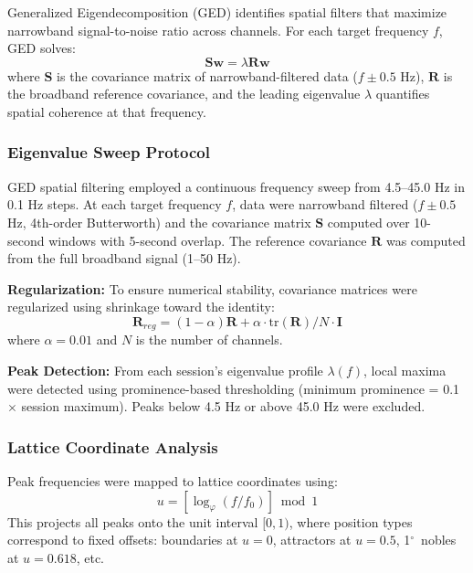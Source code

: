 \documentclass[11pt,a4paper]{article}
\newcommand{\degree}{$^\circ$}  %
\newcommand{\phisym}{\varphi}
\begin{document}
Generalized Eigendecomposition (GED) \parencite{cohen2017ged} identifies spatial filters that maximize narrowband signal-to-noise ratio across channels. For each target frequency $f$, GED solves:
\begin{equation}
\mathbf{S} \mathbf{w} = \lambda \mathbf{R} \mathbf{w}
\end{equation}
where $\mathbf{S}$ is the covariance matrix of narrowband-filtered data ($f \pm 0.5$ Hz), $\mathbf{R}$ is the broadband reference covariance, and the leading eigenvalue $\lambda$ quantifies spatial coherence at that frequency.

\subsubsection{Eigenvalue Sweep Protocol}

GED spatial filtering employed a continuous frequency sweep from 4.5--45.0 Hz in 0.1 Hz steps. At each target frequency $f$, data were narrowband filtered ($f \pm 0.5$ Hz, 4th-order Butterworth) and the covariance matrix $\mathbf{S}$ computed over 10-second windows with 5-second overlap. The reference covariance $\mathbf{R}$ was computed from the full broadband signal (1--50 Hz).

\textbf{Regularization:} To ensure numerical stability, covariance matrices were regularized using shrinkage toward the identity:
\begin{equation}
\mathbf{R}_{reg} = (1-\alpha)\mathbf{R} + \alpha \cdot \text{tr}(\mathbf{R})/N \cdot \mathbf{I}
\end{equation}
where $\alpha = 0.01$ and $N$ is the number of channels.

\textbf{Peak Detection:} From each session's eigenvalue profile $\lambda(f)$, local maxima were detected using prominence-based thresholding (minimum prominence = 0.1 $\times$ session maximum). Peaks below 4.5 Hz or above 45.0 Hz were excluded.

\subsubsection{Lattice Coordinate Analysis}

Peak frequencies were mapped to lattice coordinates using:
\begin{equation}
u = \left[\log_\phisym(f/f_0)\right] \bmod 1
\end{equation}
This projects all peaks onto the unit interval $[0, 1)$, where position types correspond to fixed offsets: boundaries at $u = 0$, attractors at $u = 0.5$, 1\degree\ nobles at $u = 0.618$, etc.
\end{document}
